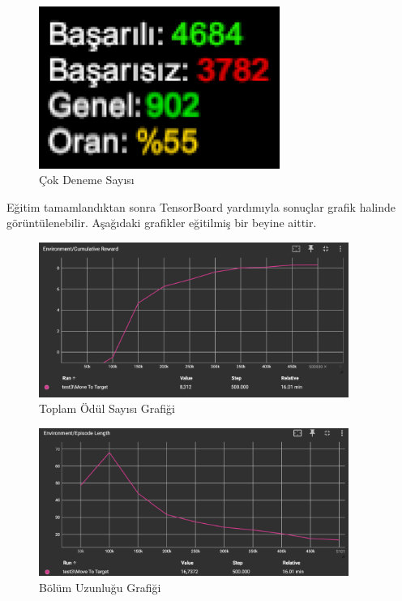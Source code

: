 \documentclass{article}
\begin{document}
\begin{figure}[h]
  \centering
  \includegraphics[width=0.7\textwidth]{basarili.png}
  \caption{Çok Deneme Sayısı}
\end{figure}

\newpage

\par Eğitim tamamlandıktan sonra TensorBoard yardımıyla sonuçlar grafik halinde görüntülenebilir. Aşağıdaki grafikler eğitilmiş bir beyine aittir.\\[5pt]

\begin{figure}[h]
  \centering
  \includegraphics[width=0.9\textwidth]{reward-grap.png}
  \caption{Toplam Ödül Sayısı Grafiği}
\end{figure}

\begin{figure}[h]
  \centering
  \includegraphics[width=0.9\textwidth]{episode-len.png}
  \caption{Bölüm Uzunluğu Grafiği}
\end{figure}
\end{document}
